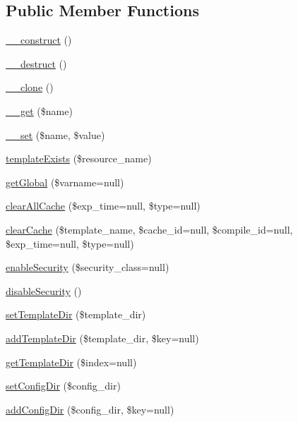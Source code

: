 \subsection*{Public Member Functions}
\begin{DoxyCompactItemize}
\item 
\hyperlink{class_smarty_a095c5d389db211932136b53f25f39685}{\+\_\+\+\_\+construct} ()
\item 
\hyperlink{class_smarty_a421831a265621325e1fdd19aace0c758}{\+\_\+\+\_\+destruct} ()
\item 
\hyperlink{class_smarty_ad0cb87b388bc74d63dc884accdca8713}{\+\_\+\+\_\+clone} ()
\item 
\hyperlink{class_smarty_abc8e9e31bb15c8a44c3210ec551407c8}{\+\_\+\+\_\+get} (\$name)
\item 
\hyperlink{class_smarty_a83c2703c91959192f759992ad5640b67}{\+\_\+\+\_\+set} (\$name, \$value)
\item 
\hyperlink{class_smarty_af27994279443196cd9088aa3aeaf2734}{template\+Exists} (\$resource\+\_\+name)
\item 
\hyperlink{class_smarty_a7dec50d860b7b419b8e03738b777e23d}{get\+Global} (\$varname=null)
\item 
\hyperlink{class_smarty_aec638a0ca4f16926506acff87ceb0aaf}{clear\+All\+Cache} (\$exp\+\_\+time=null, \$type=null)
\item 
\hyperlink{class_smarty_aff41b8ccb37be52281bcbcc87b8c7e66}{clear\+Cache} (\$template\+\_\+name, \$cache\+\_\+id=null, \$compile\+\_\+id=null, \$exp\+\_\+time=null, \$type=null)
\item 
\hyperlink{class_smarty_af93918d13380160df50af41d18eb4a09}{enable\+Security} (\$security\+\_\+class=null)
\item 
\hyperlink{class_smarty_a02e591ec307da39655fa94f41037b4bd}{disable\+Security} ()
\item 
\hyperlink{class_smarty_af59c69ae277a790f659b6fa9996277fa}{set\+Template\+Dir} (\$template\+\_\+dir)
\item 
\hyperlink{class_smarty_a38d8c17db171004b36f3cc18e885b23c}{add\+Template\+Dir} (\$template\+\_\+dir, \$key=null)
\item 
\hyperlink{class_smarty_a7118a17de64b2a71cf6085e67ec027ae}{get\+Template\+Dir} (\$index=null)
\item 
\hyperlink{class_smarty_ab4c8f3616dbf358ab8efa445b52dfa03}{set\+Config\+Dir} (\$config\+\_\+dir)
\item 
\hyperlink{class_smarty_acb2ea4415c56afaaa2bd06543c28c37b}{add\+Config\+Dir} (\$config\+\_\+dir, \$key=null)

\end{DoxyCompactItemize}
